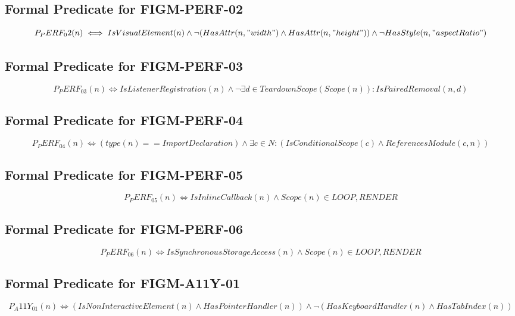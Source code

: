\subsection{Formal Predicate for FIGM-PERF-02}
\begin{equation}
P_PERF_02(n) \iff IsVisualElement(n) \land \neg (HasAttr(n, "width") \land HasAttr(n, "height")) \land \neg HasStyle(n, "aspectRatio")
\end{equation}

\subsection{Formal Predicate for FIGM-PERF-03}
\begin{equation}
P_PERF_03(n) \iff IsListenerRegistration(n) \land \neg \exists d \in TeardownScope(Scope(n)): IsPairedRemoval(n, d)
\end{equation}

\subsection{Formal Predicate for FIGM-PERF-04}
\begin{equation}
P_PERF_04(n) \iff (type(n) == ImportDeclaration) \land \exists c \in N: (IsConditionalScope(c) \land ReferencesModule(c, n))
\end{equation}

\subsection{Formal Predicate for FIGM-PERF-05}
\begin{equation}
P_PERF_05(n) \iff IsInlineCallback(n) \land Scope(n) \in {LOOP, RENDER}
\end{equation}

\subsection{Formal Predicate for FIGM-PERF-06}
\begin{equation}
P_PERF_06(n) \iff IsSynchronousStorageAccess(n) \land Scope(n) \in {LOOP, RENDER}
\end{equation}

\subsection{Formal Predicate for FIGM-A11Y-01}
\begin{equation}
P_A11Y_01(n) \iff (IsNonInteractiveElement(n) \land HasPointerHandler(n)) \land \neg (HasKeyboardHandler(n) \land HasTabIndex(n))
\end{equation}

